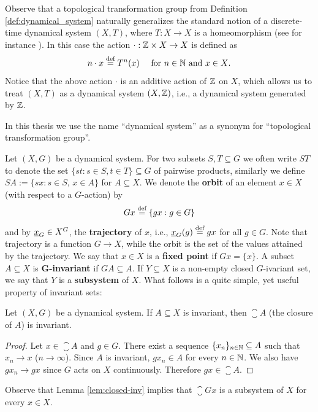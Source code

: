 Observe that a topological transformation group from Definition \ref{def:dynamical_system} naturally generalizes the standard notion of a discrete-time dynamical system $(X,T)$, where  $T:X\to X$ is a homeomorphism (see for instance \cite{HK95}). In this case the action $\cdot: \mathbb{Z}\times X \to X$ is defined as 
\[
 n\cdot x\stackrel{\textup{def}}{=} T^n(x)~~~~ \mbox{for $n\in\mathbb{N}$ and $x\in X$}.
\]
Notice that the above action $\cdot$ 
is an additive action of $\mathbb{Z}$ on $X$, which allows us to treat $(X,T)$ as a dynamical system $(X,\mathbb{Z})$, i.e., a dynamical system generated by $\mathbb{Z}$.

In this thesis we use the name ``dynamical system'' as a synonym for ``topological transformation group''.

Let $(X,G)$ be a dynamical system.
%
For two subsets $S,T \subseteq G$ we often write $ST$ to denote the set $\{st: s\in S, t\in T\} \subseteq G$ of pairwise products, similarly we define $SA:=\{sx:s\in S,\,x\in A\}$ for $A\subseteq X$.
%
We denote the {\bf orbit} of an element ${x}\in X$ (with respect to a $G$-action) by
\[
Gx\stackrel{\textup{def}}{=} \{gx:g\in G\}
\]
and by $\underline{x}_G\in X^G$, the {\bf trajectory} of ${x}$, i.e., $\underline{x}_G(g)\stackrel{\textup{def}}{=} gx$ for all $g\in G$. 
%
Note that trajectory is a function $G\to X$, while the orbit is the set of the values attained by the trajectory.
%
We say that $x\in X$ is a {\bf fixed point} if $Gx=\{x\}$.
%
A subset $A\subseteq X$ is $\bm{G}${\bf-invariant} if $GA\subseteq A$. 
%
If $Y\subseteq X$ is a non-empty closed $G$-ivariant set, we say that $Y$ is a {\bf subsystem} of $X$.  
%
What follows is a quite simple, yet useful property of invariant sets:

\begin{lem}\label{lem:closed-inv}
Let $(X,G)$ be a dynamical system. If $A\subseteq X$ is invariant, then $\closure{A}$ (the closure of $A$) is invariant.
\end{lem}

\begin{proof}
Let $x\in\closure{A}$ and $g\in G$. There exist a sequence $\{x_n\}_{n\in\mathbb{N}}\subseteq A$ such that $x_n\to x$ ($n\to\infty$). Since $A$ is invariant, $gx_n\in A$ for every $n\in\mathbb{N}$. We also have $gx_n\to gx$ since $G$ acts on $X$ continuously. Therefore $gx\in\closure{A}$.
\end{proof}

\noindent
Observe that Lemma \ref{lem:closed-inv} implies that $\closure{Gx}$ is a subsystem of $X$ for every $x\in X$.

